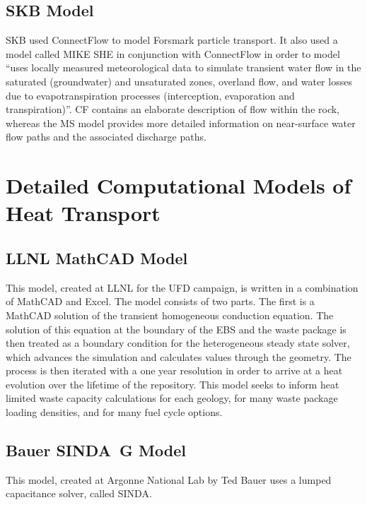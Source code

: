\subsection{SKB Model} SKB used ConnectFlow to model Forsmark particle
transport. It also used a model called MIKE SHE in conjunction with ConnectFlow
in order to model ``uses locally measured meteorological data to simulate
transient water flow in the saturated (groundwater) and unsaturated zones,
overland flow, and water losses due to evapotranspiration processes
(interception, evaporation and transpiration)''. CF contains an elaborate
description of flow within the rock, whereas the MS model provides more
detailed information on near-surface water flow paths and the associated
discharge paths.



\section{Detailed Computational Models of Heat Transport}
\label{sec:detailed_heat}



\subsection{LLNL MathCAD Model}

This model, created at \gls{LLNL} for the \gls{UFD} campaign, is written in a 
combination of MathCAD and Excel. The model consists of two parts. The first is 
a MathCAD solution of the transient homogeneous conduction equation. The 
solution of this equation at the boundary of the EBS and the waste package is 
then treated as a boundary condition for the heterogeneous steady state solver, 
which advances the simulation and calculates values through the geometry. The 
process is then iterated with a one year resolution in order to arrive at a heat 
evolution over  the lifetime of the repository. This model seeks to inform heat
limited waste capacity calculations for each geology, for many waste package 
loading densities, and for many fuel cycle options.  


\subsection{Bauer SINDA\ G Model}

This model, created at Argonne National Lab by Ted Bauer uses a lumped 
capacitance solver, called SINDA.

